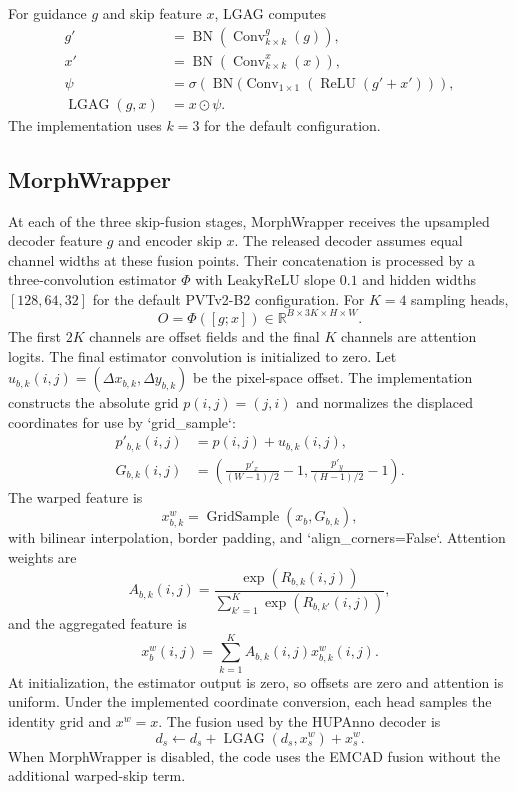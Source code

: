 \documentclass[journal]{IEEEtran}
\newcommand{\R}{\mathbb{R}}
\begin{document}
For guidance $g$ and skip feature $x$, LGAG computes
\begin{align}
 g'&=\operatorname{BN}(\operatorname{Conv}_{k\times k}^{g}(g)),\\
 x'&=\operatorname{BN}(\operatorname{Conv}_{k\times k}^{x}(x)),\\
 \psi&=\sigma\left(\operatorname{BN}(\operatorname{Conv}_{1\times1}(\operatorname{ReLU}(g'+x'))\right),\\
 \operatorname{LGAG}(g,x)&=x\odot\psi.
\end{align}
The implementation uses $k=3$ for the default configuration.

\subsection{MorphWrapper}
At each of the three skip-fusion stages, MorphWrapper receives the upsampled decoder feature $g$ and encoder skip $x$. The released decoder assumes equal channel widths at these fusion points. Their concatenation is processed by a three-convolution estimator $\Phi$ with LeakyReLU slope $0.1$ and hidden widths $[128,64,32]$ for the default PVTv2-B2 configuration. For $K=4$ sampling heads,
\begin{equation}
 O=\Phi([g;x])\in\R^{B\times3K\times H\times W}.
\end{equation}
The first $2K$ channels are offset fields and the final $K$ channels are attention logits. The final estimator convolution is initialized to zero. Let $u_{b,k}(i,j)=(\Delta x_{b,k},\Delta y_{b,k})$ be the pixel-space offset. The implementation constructs the absolute grid $p(i,j)=(j,i)$ and normalizes the displaced coordinates for use by `grid_sample`:
\begin{align}
 p'_{b,k}(i,j)&=p(i,j)+u_{b,k}(i,j),\\
 G_{b,k}(i,j)&=\left(\frac{p'_x}{(W-1)/2}-1,\frac{p'_y}{(H-1)/2}-1\right).
\end{align}
The warped feature is
\begin{equation}
 x_{b,k}^{w}=\operatorname{GridSample}(x_b,G_{b,k}),
\end{equation}
with bilinear interpolation, border padding, and `align_corners=False`. Attention weights are
\begin{equation}
 A_{b,k}(i,j)=\frac{\exp(R_{b,k}(i,j))}{\sum_{k'=1}^{K}\exp(R_{b,k'}(i,j))},
\end{equation}
and the aggregated feature is
\begin{equation}
 x_b^{w}(i,j)=\sum_{k=1}^{K}A_{b,k}(i,j)x_{b,k}^{w}(i,j).
\end{equation}
At initialization, the estimator output is zero, so offsets are zero and attention is uniform. Under the implemented coordinate conversion, each head samples the identity grid and $x^w=x$. The fusion used by the HUPAnno decoder is
\begin{equation}
 d_s\leftarrow d_s+\operatorname{LGAG}(d_s,x_s^w)+x_s^w.
\end{equation}
When MorphWrapper is disabled, the code uses the EMCAD fusion without the additional warped-skip term.
\end{document}
